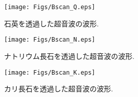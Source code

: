 \begin{figure}
\begin{center}
	\texttt{[image: Figs/Bscan\_Q.eps]}
	\caption{石英を透過した超音波の波形.}
	\label{fig:fig6}
\end{center}
\end{figure}
\begin{figure}
\begin{center}
	\texttt{[image: Figs/Bscan\_N.eps]}
	\caption{ナトリウム長石を透過した超音波の波形.}
	\label{fig:fig7}
\end{center}
\end{figure}
\begin{figure}
\begin{center}
	\texttt{[image: Figs/Bscan\_K.eps]}
	\caption{カリ長石を透過した超音波の波形.}
	\label{fig:fig8}
\end{center}
\end{figure}
